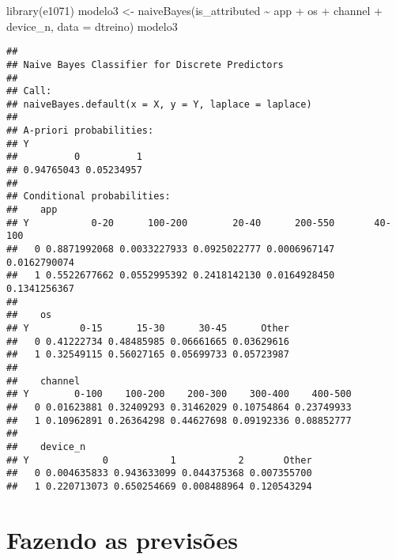 \documentclass[
]{article}
\newenvironment{Shaded}{\begin{snugshade}}{\end{snugshade}}
\newcommand{\AttributeTok}[1]{\textcolor[rgb]{0.77,0.63,0.00}{#1}}
\newcommand{\FunctionTok}[1]{\textcolor[rgb]{0.00,0.00,0.00}{#1}}
\newcommand{\NormalTok}[1]{#1}
\newcommand{\OtherTok}[1]{\textcolor[rgb]{0.56,0.35,0.01}{#1}}
\newcommand{\SpecialCharTok}[1]{\textcolor[rgb]{0.00,0.00,0.00}{#1}}
\begin{document}
\begin{Shaded}
\begin{Highlighting}[]
\FunctionTok{library}\NormalTok{(e1071)}
\NormalTok{modelo3 }\OtherTok{\textless{}{-}} \FunctionTok{naiveBayes}\NormalTok{(is\_attributed }\SpecialCharTok{\textasciitilde{}}\NormalTok{ app  }\SpecialCharTok{+}\NormalTok{ os }\SpecialCharTok{+}\NormalTok{ channel }\SpecialCharTok{+}\NormalTok{ device\_n, }
                      \AttributeTok{data =}\NormalTok{ dtreino)}
\NormalTok{modelo3}
\end{Highlighting}
\end{Shaded}

\begin{verbatim}
## 
## Naive Bayes Classifier for Discrete Predictors
## 
## Call:
## naiveBayes.default(x = X, y = Y, laplace = laplace)
## 
## A-priori probabilities:
## Y
##          0          1 
## 0.94765043 0.05234957 
## 
## Conditional probabilities:
##    app
## Y           0-20      100-200        20-40      200-550       40-100
##   0 0.8871992068 0.0033227933 0.0925022777 0.0006967147 0.0162790074
##   1 0.5522677662 0.0552995392 0.2418142130 0.0164928450 0.1341256367
## 
##    os
## Y         0-15      15-30      30-45      Other
##   0 0.41222734 0.48485985 0.06661665 0.03629616
##   1 0.32549115 0.56027165 0.05699733 0.05723987
## 
##    channel
## Y        0-100    100-200    200-300    300-400    400-500
##   0 0.01623881 0.32409293 0.31462029 0.10754864 0.23749933
##   1 0.10962891 0.26364298 0.44627698 0.09192336 0.08852777
## 
##    device_n
## Y             0           1           2       Other
##   0 0.004635833 0.943633099 0.044375368 0.007355700
##   1 0.220713073 0.650254669 0.008488964 0.120543294
\end{verbatim}

\hypertarget{fazendo-as-previsuxf5es}{%
\section{Fazendo as previsões}\label{fazendo-as-previsuxf5es}}

\begin{Shaded}
\end{Shaded}
\end{document}

